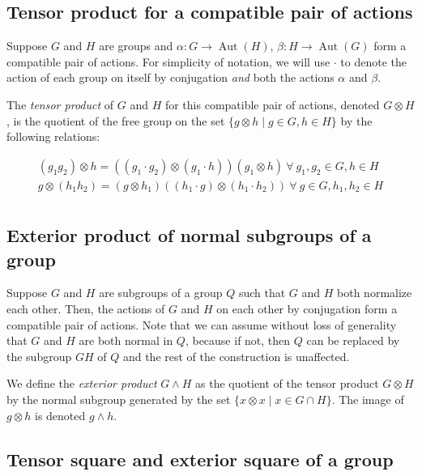 \documentclass{ucetd}
\begin{document}
\subsection{Tensor product for a compatible pair of actions}\label{sec:tensorproduct-explicit}

Suppose $G$ and $H$ are groups and $\alpha:G \to
\operatorname{Aut}(H)$, $\beta:H \to \operatorname{Aut}(G)$ form a
compatible pair of actions. For simplicity of notation, we will use
$\cdot$ to denote the action of each group on itself by conjugation
{\em and} both the actions $\alpha$ and $\beta$.

The {\em tensor product} of $G$ and $H$ for this compatible pair of
actions, denoted $G \otimes H$, is the quotient of the free group on
the set $\{ g \otimes h \mid g \in G, h \in H \}$ by the following
relations:

\begin{eqnarray*}
  (g_1g_2) \otimes h = ((g_1 \cdot g_2) \otimes (g_1 \cdot h))(g_1 \otimes h) \ \forall \ g_1,g_2 \in G, h \in H\\
  g \otimes (h_1h_2) = (g \otimes h_1)((h_1 \cdot g) \otimes (h_1 \cdot h_2)) \ \forall \ g \in G, h_1,h_2 \in H\\
\end{eqnarray*}

\subsection{Exterior product of normal subgroups of a group}

Suppose $G$ and $H$ are subgroups of a group $Q$ such that $G$ and $H$
both normalize each other. Then, the actions of $G$ and $H$ on each
other by conjugation form a compatible pair of actions. Note that we
can assume without loss of generality that $G$ and $H$ are both normal
in $Q$, because if not, then $Q$ can be replaced by the subgroup $GH$
of $Q$ and the rest of the construction is unaffected.

We define the {\em exterior product} $G \wedge H$ as the quotient of
the tensor product $G \otimes H$ by the normal subgroup generated by
the set $\{ x \otimes x \mid x \in G \cap H \}$. The image of $g
\otimes h$ is denoted $g \wedge h$.

\subsection{Tensor square and exterior square of a group}\label{sec:exteriorsquare-explicit}
\end{document}
